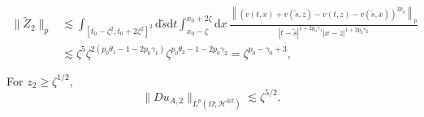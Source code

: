 \documentclass[10pt,a4paper]{amsart}
\newcommand {\deltah}{{\zeta}}
\renewcommand{\d}{\mathrm{d}}
\begin{document}
           \begin{align}
           \|\tilde{Z}_2\|_{p} &\lesssim    \int_{[t_0-\deltah^2, t_0+2\deltah^2]^2}\d \tilde{s}\d t \int_{x_0-\deltah}^{x_0+2\deltah} \d x\, 
               \frac {\left\|(v(t,x)+v(\tilde{s},z)-v(t,z)-v(\tilde{s},x))^{2p_0}\right\|_{p}}{|t-\tilde{s}|^{1+2p_0\gamma_1}|x-z|^{1+2p_0\gamma_2}}\nonumber\\
           &\lesssim \deltah^{5}\deltah^{2(p_0\theta_1-1-2p_0\gamma_1)}\deltah^{p_0\theta_2-1-2p_0\gamma_2}
           =\deltah^{p_0-\gamma_0+3}, \label{eq:z2}
           \end{align}

 \begin{lemma}\label{lem:DuA2}
 For $z_2\geq \deltah^{1/2}$,  
 \begin{equation} \label{UA}
 \|Du_{A,2}\|_{L^p(\Omega;\mathcal{H}^{\otimes2})} \lesssim \deltah^{5/2}.
 \end{equation}
 \end{lemma}
\end{document}
